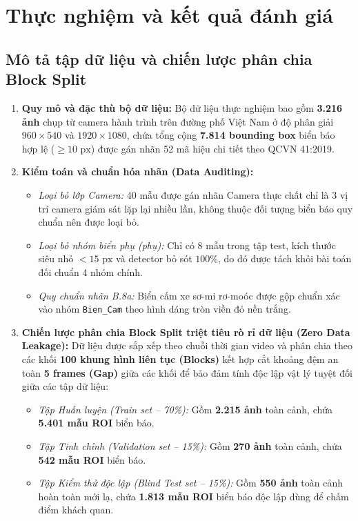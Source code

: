 ﻿\section{Thực nghiệm và kết quả đánh giá}
\label{sec:thuc_nghiem}

\subsection{Mô tả tập dữ liệu và chiến lược phân chia Block Split}
\label{subsec:dataset_blocksplit}

\begin{enumerate}
    \item \textbf{Quy mô và đặc thù bộ dữ liệu:} Bộ dữ liệu thực nghiệm bao gồm \textbf{3.216 ảnh} chụp từ camera hành trình trên đường phố Việt Nam ở độ phân giải $960 \times 540$ và $1920 \times 1080$, chứa tổng cộng \textbf{7.814 bounding box} biển báo hợp lệ ($\ge 10\text{ px}$) được gán nhãn 52 mã hiệu chi tiết theo QCVN 41:2019.

    \item \textbf{Kiểm toán và chuẩn hóa nhãn (Data Auditing):}
    \begin{itemize}
        \item \textit{Loại bỏ lớp Camera:} 40 mẫu được gán nhãn Camera thực chất chỉ là 3 vị trí camera giám sát lặp lại nhiều lần, không thuộc đối tượng biển báo quy chuẩn nên được loại bỏ.
        \item \textit{Loại bỏ nhóm biển phụ (phụ):} Chỉ có 8 mẫu trong tập test, kích thước siêu nhỏ $< 15\text{ px}$ và detector bỏ sót $100\%$, do đó được tách khỏi bài toán đối chuẩn 4 nhóm chính.
        \item \textit{Quy chuẩn nhãn B.8a:} Biển cấm xe sơ-mi rơ-moóc được gộp chuẩn xác vào nhóm \texttt{Bien\_Cam} theo hình dáng tròn viền đỏ nền trắng.
    \end{itemize}

    \item \textbf{Chiến lược phân chia Block Split triệt tiêu rò rỉ dữ liệu (Zero Data Leakage):}
    Dữ liệu được sắp xếp theo chuỗi thời gian video và phân chia theo các khối \textbf{100 khung hình liên tục (Blocks)} kết hợp cắt khoảng đệm an toàn \textbf{5 frames (Gap)} giữa các khối để bảo đảm tính độc lập vật lý tuyệt đối giữa các tập dữ liệu:
    \begin{itemize}
        \item \textit{Tập Huấn luyện (Train set -- 70\%):} Gồm \textbf{2.215 ảnh} toàn cảnh, chứa \textbf{5.401 mẫu ROI} biển báo.
        \item \textit{Tập Tinh chỉnh (Validation set -- 15\%):} Gồm \textbf{270 ảnh} toàn cảnh, chứa \textbf{542 mẫu ROI} biển báo.
        \item \textit{Tập Kiểm thử độc lập (Blind Test set -- 15\%):} Gồm \textbf{550 ảnh} toàn cảnh hoàn toàn mới lạ, chứa \textbf{1.813 mẫu ROI} biển báo độc lập dùng để chấm điểm khách quan.
    \end{itemize}
\end{enumerate}

